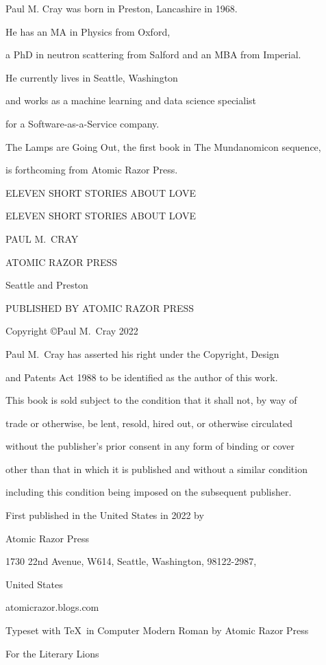 {\parindent=0pt {\obeylines
\vskip 1cm
{\centerline{Paul M. Cray was born in Preston, Lancashire in 1968.}}
{\centerline{He has an MA in Physics from Oxford,}}
{\centerline{a PhD in neutron scattering from Salford and an MBA from Imperial.}}
{\centerline{He currently lives in Seattle, Washington}}
{\centerline{and works as a machine learning and data science specialist}}
{\centerline{for a Software-as-a-Service company.}}
{\centerline{{\twelvesl The Lamps are Going Out}, the first book in {\twelvesl The Mundanomicon\/} sequence,}}
{\centerline{is forthcoming from Atomic Razor Press.}}
\vfill\eject
{\centerline{}}
\vfill\eject
\vskip 1cm
{\centerline{\twelvess ELEVEN SHORT STORIES ABOUT LOVE}}
\vfill\eject
{\centerline{}}
\vfill\eject
\vskip 1cm
{\centerline{\seventeenss ELEVEN SHORT STORIES ABOUT LOVE}}
\vskip 5cm
{\centerline{\seventeenss PAUL M.~CRAY}}
\vskip 9cm
{\centerline{\twelvebf ATOMIC RAZOR PRESS}}
{\centerline{\twelvebf Seattle and Preston}}
\vfill\eject
{\twelverm
{\centerline{PUBLISHED BY ATOMIC RAZOR PRESS}}
\vskip 12pt
{\centerline{Copyright \copyright Paul M.~Cray 2022}}
\vskip 12pt
{\centerline{Paul M.~Cray has asserted his right under the Copyright, Design}}
{\centerline{and Patents Act 1988 to be identified as the author of this work.}}
\vskip 12pt
{\centerline{\twelveit This book is sold subject to the condition that it shall not, by way of}}
{\centerline{\twelveit trade or otherwise, be lent, resold, hired out, or otherwise circulated}}
{\centerline{\twelveit without the publisher’s prior consent in any form of binding or cover}}
{\centerline{\twelveit other than that in which it is published and without a similar condition}}
{\centerline{\twelveit including this condition being imposed on the subsequent publisher.}}
\vskip 12pt
{\centerline{First published in the United States in 2022 by}}
{\centerline{Atomic Razor Press}}
{\centerline{1730 22nd Avenue, W614, Seattle, Washington, 98122-2987,}}
{\centerline{United States}}
\vskip 12pt
{\centerline{atomicrazor.blogs.com}}
\vskip 12pt
{\centerline{Typeset with \TeX\ in Computer Modern Roman by Atomic Razor Press}}}
\vfill\eject
\vskip 1cm
{\centerline{\twelveit For the Literary Lions}}}}
\vfill\eject
{\centerline{}}
\vfill\eject

